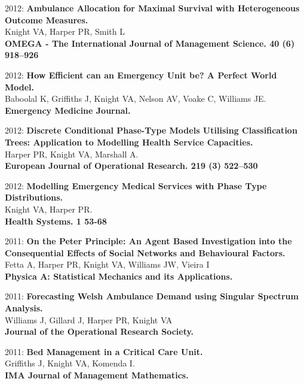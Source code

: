 \documentclass[10pt]{res} %
\begin{document}
\begin{resume}
\begin{etaremune}
\item
2012: \textbf{Ambulance Allocation for Maximal Survival with Heterogeneous Outcome Measures.}\\
Knight VA, Harper PR, Smith L\\
\textbf{OMEGA - The International Journal of Management Science. 40 (6) 918--926}
\\

\item
2012: \textbf{How Efficient can an Emergency Unit be? A Perfect World Model.}\\
Baboolal K, Griffiths J, Knight VA, Nelson AV, Voake C, Williams JE.\\
\textbf{Emergency Medicine Journal.}
\\

\item
2012: \textbf{Discrete Conditional Phase-Type Models Utilising Classification Trees: Application to Modelling Health Service Capacities.}\\
Harper PR, Knight VA, Marshall A.\\
\textbf{European Journal of Operational Research. 219 (3) 522--530}
\\

\item
2012: \textbf{Modelling Emergency Medical Services with Phase Type Distributions.}\\
Knight VA, Harper PR.\\
\textbf{Health Systems. 1 53-68}
\\

\item
2011: \textbf{On the Peter Principle: An Agent Based Investigation into the Consequential Effects of Social Networks and Behavioural Factors.}\\
Fetta A, Harper PR, Knight VA, Williams JW, Vieira I\\
\textbf{Physica A: Statistical Mechanics and its Applications.}
\\

\item
2011: \textbf{Forecasting Welsh Ambulance Demand using Singular Spectrum Analysis.}\\
Williams J, Gillard J, Harper PR, Knight VA\\
\textbf{Journal of the Operational Research Society.}
\\

\item
2011: \textbf{Bed Management in a Critical Care Unit.}\\
Griffiths J, Knight VA, Komenda I.\\
\textbf{IMA Journal of Management Mathematics.}
\\


\end{etaremune}
\end{resume}
\end{document}
